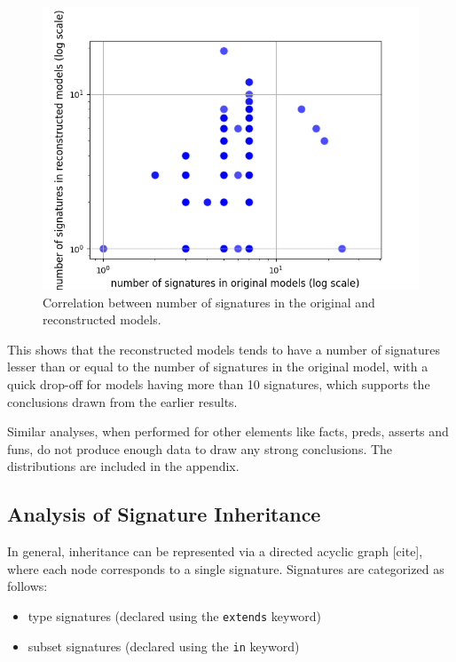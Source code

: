 \documentclass[conference]{IEEEtran}
\begin{document}
    \begin{figure}[htbp]
        \centerline{\includegraphics[width=\linewidth]{"./Correlation between number of signatures in the original and reconstructed models.png"}}
        \caption{Correlation between number of signatures in the original and reconstructed models.}
        \label{fig}
        \end{figure}

        This shows that the reconstructed models tends to have a number of signatures lesser than or equal to the number of signatures in the original model, with a quick drop-off for models having more than 10 signatures, which supports the conclusions drawn from the earlier results.

        Similar analyses, when performed for other elements like facts, preds, asserts and funs, do not produce enough data to draw any strong conclusions. The distributions are included in the appendix.

\subsection{Analysis of Signature Inheritance}

In general, inheritance can be represented via a directed acyclic graph [cite], where each node corresponds to a single signature. Signatures are categorized as follows:

\begin{itemize}
    \item type signatures (declared using the \verb|extends| keyword)
    \item subset signatures (declared using the \verb|in| keyword)
\end{itemize}
\end{document}
